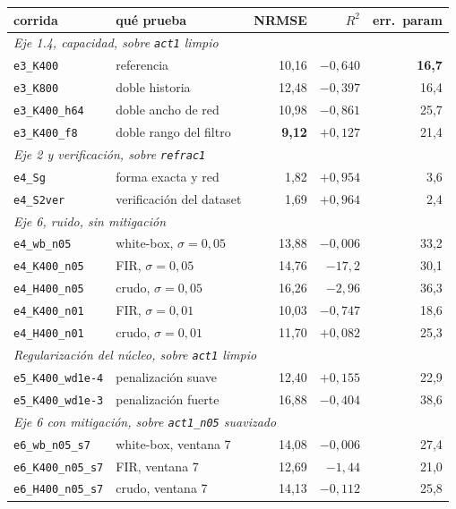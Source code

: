 \documentclass[11pt,a4paper]{article}
\begin{document}
\begin{center}
\small
\begin{tabular}{llrrr}
\toprule
\textbf{corrida} & \textbf{qué prueba} & \textbf{NRMSE} & \textbf{$R^2$} &
\textbf{err.\ param} \\
\midrule
\multicolumn{5}{l}{\emph{Eje 1.4, capacidad, sobre \texttt{act1} limpio}} \\
\texttt{e3\_K400}       & referencia                 & 10{,}16 & $-0{,}640$ & \textbf{16{,}7} \\
\texttt{e3\_K800}       & doble historia             & 12{,}48 & $-0{,}397$ & 16{,}4 \\
\texttt{e3\_K400\_h64}  & doble ancho de red         & 10{,}98 & $-0{,}861$ & 25{,}7 \\
\rowcolor{suave}
\texttt{e3\_K400\_f8}   & doble rango del filtro     & \textbf{9{,}12} & $+0{,}127$ & 21{,}4 \\
\midrule
\multicolumn{5}{l}{\emph{Eje 2 y verificación, sobre \texttt{refrac1}}} \\
\texttt{e4\_Sg}         & forma exacta y red         & 1{,}82 & $+0{,}954$ & 3{,}6 \\
\texttt{e4\_S2ver}      & verificación del dataset   & 1{,}69 & $+0{,}964$ & 2{,}4 \\
\midrule
\multicolumn{5}{l}{\emph{Eje 6, ruido, sin mitigación}} \\
\texttt{e4\_wb\_n05}    & white-box, $\sigma=0{,}05$ & 13{,}88 & $-0{,}006$ & 33{,}2 \\
\texttt{e4\_K400\_n05}  & FIR, $\sigma=0{,}05$       & 14{,}76 & $-17{,}2$  & 30{,}1 \\
\texttt{e4\_H400\_n05}  & crudo, $\sigma=0{,}05$     & 16{,}26 & $-2{,}96$  & 36{,}3 \\
\texttt{e4\_K400\_n01}  & FIR, $\sigma=0{,}01$       & 10{,}03 & $-0{,}747$ & 18{,}6 \\
\texttt{e4\_H400\_n01}  & crudo, $\sigma=0{,}01$     & 11{,}70 & $+0{,}082$ & 25{,}3 \\
\midrule
\multicolumn{5}{l}{\emph{Regularización del núcleo, sobre \texttt{act1} limpio}} \\
\texttt{e5\_K400\_wd1e-4} & penalización suave       & 12{,}40 & $+0{,}155$ & 22{,}9 \\
\texttt{e5\_K400\_wd1e-3} & penalización fuerte      & 16{,}88 & $-0{,}404$ & 38{,}6 \\
\midrule
\multicolumn{5}{l}{\emph{Eje 6 con mitigación, sobre \texttt{act1\_n05} suavizado}} \\
\texttt{e6\_wb\_n05\_s7} & white-box, ventana 7      & 14{,}08 & $-0{,}006$ & 27{,}4 \\
\texttt{e6\_K400\_n05\_s7} & FIR, ventana 7           & 12{,}69 & $-1{,}44$  & 21{,}0 \\
\texttt{e6\_H400\_n05\_s7} & crudo, ventana 7         & 14{,}13 & $-0{,}112$ & 25{,}8 \\
\bottomrule
\end{tabular}
\end{center}
\end{document}
